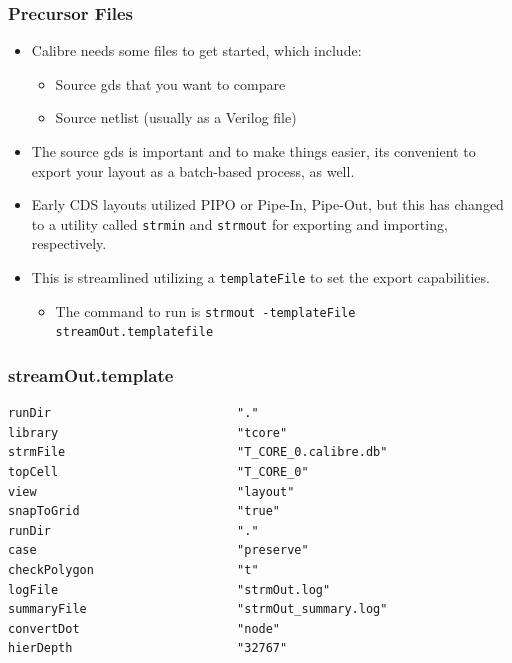 \documentclass{beamer}
\begin{document}
\begin{frame}[fragile]
\frametitle{Precursor Files}
\begin{itemize}
\item Calibre needs some files to get started, which include:
\begin{itemize}
\item Source gds that you want to compare
\item Source netlist (usually as a Verilog file)
\end{itemize}
\item The source gds is important and to make things easier, its
  convenient to export your layout as a batch-based process, as well.
\item Early CDS layouts utilized PIPO or Pipe-In,
  Pipe-Out, but this has changed to a utility called \verb+strmin+ and
  \verb+strmout+ for exporting and importing, respectively.
\item This is streamlined utilizing a \verb+templateFile+ to set the
  export capabilities.
\begin{itemize}
\item The command to run is \verb+strmout -templateFile streamOut.templatefile+
\end{itemize}
\end{itemize}
\end{frame}
\begin{frame}[fragile]
\frametitle{streamOut.template}
\footnotesize
\begin{verbatim}
runDir                          "."
library                         "tcore"
strmFile                        "T_CORE_0.calibre.db"
topCell                         "T_CORE_0" 
view                            "layout"
snapToGrid                      "true"
runDir                          "."
case                            "preserve"
checkPolygon                    "t"
logFile                         "strmOut.log"
summaryFile                     "strmOut_summary.log"
convertDot                      "node"
hierDepth                       "32767"
\end{verbatim}
\normalsize
\end{frame}
\end{document}
